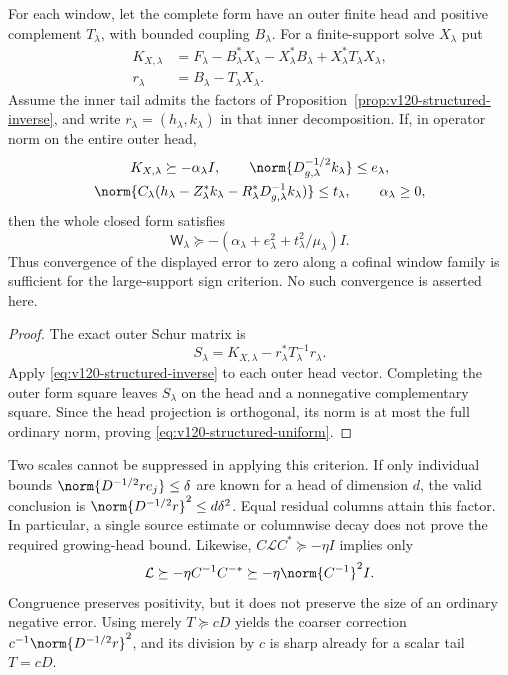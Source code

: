 \begin{proposition}
\label{prop:v120-structured-uniform}
For each window, let the complete form have an outer finite head
and positive complement $T_\lambda$, with bounded coupling
$B_\lambda$. For a finite-support solve $X_\lambda$ put
\[
 \begin{split}
 K_{X,\lambda}&=F_\lambda-B_\lambda^*X_\lambda
       -X_\lambda^*B_\lambda+X_\lambda^*T_\lambda X_\lambda,\\
 r_\lambda&=B_\lambda-T_\lambda X_\lambda.
 \end{split}
\]
Assume the inner tail admits the factors of
Proposition~\ref{prop:v120-structured-inverse}, and write
$r_\lambda=(h_\lambda,k_\lambda)$ in that inner decomposition.
If, in operator norm on the entire outer head,
\[
 \begin{gathered}
 K_{X,\lambda}\succeq-\alpha_\lambda I,\qquad
 \norm{D_{g,\lambda}^{-1/2}k_\lambda}\le e_\lambda,\\
 \norm{C_\lambda(h_\lambda-Z_\lambda^*k_\lambda
       -R_\lambda^*D_{g,\lambda}^{-1}k_\lambda)}\le t_\lambda,
 \qquad \alpha_\lambda\ge0,
 \end{gathered}
\]
then the whole closed form satisfies
\begin{equation}\label{eq:v120-structured-uniform}
 \mathsf W_\lambda\succeq
 -\left(\alpha_\lambda+e_\lambda^2+
               t_\lambda^2/\mu_\lambda\right)I.
\end{equation}
Thus convergence of the displayed error to zero along a cofinal
window family is sufficient for the large-support sign criterion.
No such convergence is asserted here.
\end{proposition}
\begin{proof}
The exact outer Schur matrix is
\[
 S_\lambda=K_{X,\lambda}-r_\lambda^*T_\lambda^{-1}r_\lambda.
\]
Apply \eqref{eq:v120-structured-inverse} to each outer head vector.
Completing the outer form square leaves $S_\lambda$ on the head
and a nonnegative complementary square. Since the head projection
is orthogonal, its norm is at most the full ordinary norm, proving
\eqref{eq:v120-structured-uniform}.
\end{proof}

Two scales cannot be suppressed in applying this criterion.
If only individual bounds
$\norm{D^{-1/2}r e_j}\le\delta$ are known for a head of
dimension $d$, the valid conclusion is
$\norm{D^{-1/2}r}^2\le d\delta^2$. Equal residual columns
attain this factor. In particular, a single source estimate or
columnwise decay does not prove the required growing-head bound.
Likewise, $C\mathcal L C^*\succeq-\eta I$ implies only
\[
 \mathcal L\succeq-\eta C^{-1}C^{-*}
             \succeq-\eta\norm{C^{-1}}^2I.
\]
Congruence preserves positivity, but it does not preserve the size
of an ordinary negative error. Using merely $T\succeq cD$
yields the coarser correction
$c^{-1}\norm{D^{-1/2}r}^2$, and its division by $c$ is sharp
already for a scalar tail $T=cD$.

